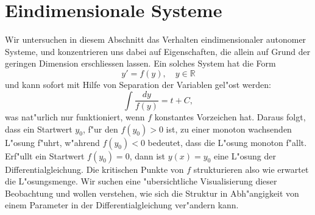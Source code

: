 \section{Eindimensionale Systeme}
Wir untersuchen in diesem Abschnitt das Verhalten eindimensionaler autonomer
Systeme, und konzentrieren uns dabei auf Eigenschaften, die allein
auf Grund der geringen Dimension erschliessen lassen.
Ein solches System hat die Form
\[
y'=f(y),\quad y\in\mathbb R
\]
und kann sofort mit Hilfe von Separation der Variablen gel"ost werden:
\[
\int\frac{dy}{f(y)} = t+C,
\]
was nat"urlich nur funktioniert, wenn $f$ konstantes Vorzeichen hat.
Daraus folgt, dass ein Startwert $y_0$, f"ur den $f(y_0)>0$ ist,
zu einer monoton wachsenden L"osung f"uhrt, w"ahrend $f(y_0)<0$
bedeutet, dass die L"osung monoton f"allt.
Erf"ullt ein Startwert $f(y_0)=0$, dann ist $y(x)=y_0$ eine
L"osung der Differentialgleichung.
Die kritischen Punkte von $f$ strukturieren also wie erwartet die
L"osungsmenge.
Wir suchen eine "ubersichtliche Visualisierung dieser Beobachtung
und wollen verstehen, wie sich die Struktur in Abh"angigkeit
von einem Parameter in der Differentialgleichung ver"andern kann.

%
%
